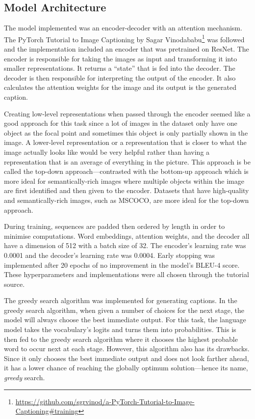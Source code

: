 \documentclass[11pt,a4paper]{article}
\begin{document}
\subsection{Model Architecture}
\label{ssec:modelarchi}
The model implemented was an encoder-decoder with an attention mechanism. The PyTorch Tutorial to Image Captioning by Sagar Vinodababu\footnote{\url{https://github.com/sgrvinod/a-PyTorch-Tutorial-to-Image-Captioning#training}} was followed and the implementation included an encoder that was pretrained on ResNet. The encoder is responsible for taking the images as input and transforming it into smaller representations. It returns a “state” that is fed into the decoder. The decoder is then responsible for interpreting the output of the encoder. It also calculates the attention weights for the image and its output is the generated caption.

Creating low-level representations when passed through the encoder seemed like a good approach for this task since a lot of images in the dataset only have one object as the focal point and sometimes this object is only partially shown in the image. A lower-level representation or a representation that is closer to what the image actually looks like would be very helpful rather than having a representation that is an average of everything in the picture. This approach is be called the top-down approach—contrasted with the bottom-up approach which is more ideal for semantically-rich images where multiple objects within the image are first identified and then given to the encoder. \citep{Anderson-2017-bottomuptopdown} Datasets that have high-quality and semantically-rich images, such as MSCOCO, are more ideal for the top-down approach.

During training, sequences are padded then ordered by length in order to minimise computations. Word embeddings, attention weights, and the decoder all have a dimension of 512 with a batch size of 32. The encoder’s learning rate was 0.0001 and the decoder’s learning rate was 0.0004. Early stopping was implemented after 20 epochs of no improvement in the model's BLEU-4 score. These hyperparameters and implementations were all chosen through the tutorial source.  

The greedy search algorithm was implemented for generating captions. In the greedy search algorithm, when given a number of choices for the next stage, the model will always choose the best immediate output. For this task, the language model takes the vocabulary’s logits and turns them into probabilities. This is then fed to the greedy search algorithm where it chooses the highest probable word to occur next at each stage. However, this algorithm also has its drawbacks. Since it only chooses the best immediate output and does not look farther ahead, it has a lower chance of reaching the globally optimum solution—hence its name, \emph{greedy} search.
\end{document}
